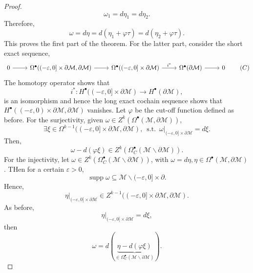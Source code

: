 \documentclass[10pt]{article}
\DeclareMathOperator{\straw}{s.t.}
\DeclareMathOperator{\supp}{supp}
\newcommand{\M}[0]{\mathcal{M}}
\newcommand{\st}[0]{\:\straw\:}
\begin{document}
\begin{proof}
  \begin{equation*}
    \omega_1 = d\eta_1 = d\eta_2.
  \end{equation*}
  Therefore,
  \begin{equation*}
    \omega = d\eta = d(\eta_1+\varphi\tau) = d(\eta_2+\varphi\tau).
  \end{equation*}
  This proves the first part of the theorem. For the latter part, consider the short exact sequence,
  \begin{equation*}
    \begin{tikzcd}
0 \arrow[r] & {\Omega^\bullet((-\varepsilon,0]\times\partial\M,\partial\M)} \arrow[r] & {\Omega^\bullet((-\varepsilon,0]\times\partial\M)} \arrow[r, "i^*"] & \Omega^\bullet(\partial\M) \arrow[r] & 0
\end{tikzcd}
\tag{$C$}\label{short_exact_sequence_rel_cohomology}
  \end{equation*}
  The homotopy operator shows that 
  \begin{equation*}
    i^*:H^\bullet((-\varepsilon,0]\times\partial\M)\to H^\bullet(\partial\M),
  \end{equation*}
  is an isomorphism and hence the long exact cochain sequence shows that 
  $H^\bullet((-\varepsilon,0)\times\partial\M,\partial\M)$ vanishes. Let $\varphi$ be the cut-off function defined as before. For the surjectivity, given $\omega\in Z^k(\Omega^\bullet(\M,\partial\M))$,
  \begin{equation*}
  \exists \xi\in\Omega^{k-1}((-\varepsilon,0]\times\partial\M,\partial\M),\st \omega|_{(-\varepsilon,0]\times\partial\M}=d\xi.
  \end{equation*}
  Then,
  \begin{equation*}
  \omega -d(\varphi\xi)\in Z^k(\Omega_C^\bullet(\M\backslash\partial\M)).
  \end{equation*}
  For the injectivity, let $\omega\in Z^k(\Omega_C^\bullet(\M\backslash\partial\M))$, with $\omega=d\eta,\eta\in\Omega^\bullet(\M,\partial\M)$. THen for a certain $\varepsilon>0$, 
  \begin{equation*}
  \supp\omega\subseteq\M\backslash(-\varepsilon,0]\times\partial.
  \end{equation*}
  Hence,
  \begin{equation*}
    \eta|_{(-\varepsilon,0]\times\partial\M}\in Z^{k-1}((-\varepsilon,0]\times\partial\M,\partial\M).
  \end{equation*}
  As before,
  \begin{equation*}
    \eta|_{(-\varepsilon,0]\times\partial\M}=d\xi,
  \end{equation*}
  then 
  \begin{equation*}
    \omega = d(\underbrace{\eta-d(\varphi\xi)}_{\in\Omega_C^\bullet(\M\backslash\partial\M)}).
  \end{equation*}
\end{proof}
\end{document}

